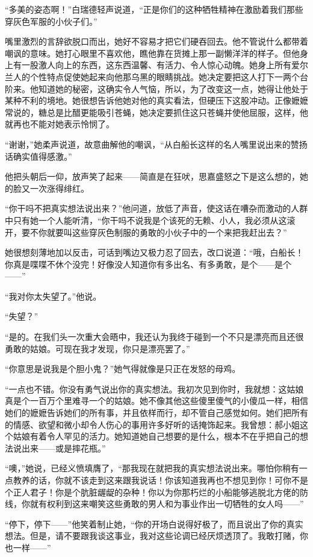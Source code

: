 \par “多美的姿态啊！”白瑞德轻声说道，“正是你们的这种牺牲精神在激励着我们那些穿灰色军服的小伙子们。”
\par 嘴里激烈的言辞欲脱口而出，她好不容易才把它们硬吞回去。他不管说什么都带着嘲讽的意味。她打心眼里不喜欢他，瞧他靠在货摊上那一副懒洋洋的样子。但他身上有一股激人向上的东西，这东西温馨、有活力、令人惊心动魄。她身上所有爱尔兰人的个性特点促使她起来向他那乌黑的眼睛挑战。她决定要把这人打下一两个台阶来。他知道她的秘密，这确实令人气恼，所以，为了改变这一点，她得让他处于某种不利的境地。她很想告诉他她对他的真实看法，但硬压下这股冲动。正像嬷嬷常说的，糖总是比醋更能吸引苍蝇，她决定要抓住这只苍蝇并使他屈服，这样，他就再也不能对她表示怜悯了。
\par “谢谢，”她柔声说道，故意曲解他的嘲讽，“从白船长这样的名人嘴里说出来的赞扬话确实值得感激。”
\par 他把头朝后一仰，放声笑了起来——简直是在狂吠，思嘉盛怒之下是这么想的，她的脸又一次涨得绯红。
\par “你干吗不把真实想法说出来？”他问道，放低了声音，使这话在嘈杂而激动的人群中只有她一个人能听清，“你干吗不说我是个该死的无赖、小人，我必须从这滚开，要不你就要叫这些穿灰色制服的勇敢的小伙子中的一个来把我赶出去？”
\par 她很想刻薄地加以反击，可话到嘴边又极力忍了回去，改口说道：“哦，白船长！你真是喋喋不休个没完！好像没人知道你有多出名、有多勇敢，是个——是个——”
\par “我对你太失望了。”他说。
\par “失望？”
\par “是的。在我们头一次重大会晤中，我还认为我终于碰到一个不只是漂亮而且还很勇敢的姑娘。可现在我才发现，你只是漂亮罢了。”
\par “你意思是说我是个胆小鬼？”她气得就像是只正在发怒的母鸡。
\par “一点也不错。你没有勇气说出你的真实想法。我初次见到你时，我就想：这姑娘真是个一百万个里难寻一个的姑娘。她不像其他这些傻里傻气的小傻瓜一样，相信她们的嬷嬷告诉她们的所有事，并且依样而行，却不管自己感觉如何。她们把所有的情感、欲望和微小却令人伤心的事用许多好听的话掩饰起来。我曾想：郝小姐这个姑娘有着令人罕见的活力。她知道她自己想要的是什么，根本不在乎把自己的想法说出来——或是摔花瓶。”
\par “噢，”她说，已经义愤填膺了，“那我现在就把我的真实想法说出来。哪怕你稍有一点教养的话，你就不该走到这来跟我说话！你该知道我再也不想见到你！可你不是个正人君子！你是个肮脏龌龊的杂种！你以为你那朽烂的小船能够逃脱北方佬的防线，你就有权利到这来嘲笑这些勇敢的男人和为事业作出一切牺牲的女人吗——”
\par “停下，停下——”他笑着制止她，“你的开场白说得好极了，而且说出了你的真实想法。但是，请不要跟我谈这事业，我对这些论调已经厌烦透顶了。我敢打赌，你也一样——”
